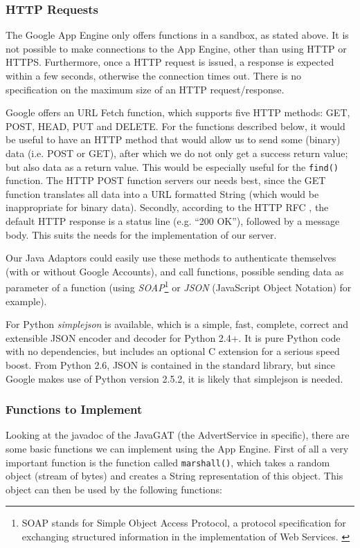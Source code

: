 \subsubsection{HTTP Requests}
The Google App Engine only offers functions in a sandbox, as stated above. It is
not possible to make connections to the App Engine, other than using HTTP or
HTTPS. Furthermore, once a HTTP request is issued, a response is expected within
a few seconds, otherwise the connection times out. There is no specification on
the maximum size of an HTTP request/response.

Google offers an URL Fetch function, which supports five HTTP methods: GET, POST,
HEAD, PUT and DELETE. For the functions described below, it would be useful to
have an HTTP method that would allow us to send some (binary) data (i.e. POST or
GET), after which we do not only get a success return value; but also data as a
return value. This would be especially useful for the \texttt{find()} function.
The HTTP POST function servers our needs best, since the GET function translates
all data into a URL formatted String (which would be inappropriate for binary
data). Secondly, according to the HTTP RFC , the default HTTP response is a
status line (e.g. ``200 OK''), followed by a message body. This suits the needs
for the implementation of our server.

Our Java Adaptors could easily use these methods to authenticate themselves (with
or without Google Accounts), and call functions, possible sending data as
parameter of a function (using \emph{SOAP}\footnote{SOAP stands for Simple
Object Access Protocol, a protocol specification for exchanging structured
information in the implementation of Web Services. \cite{soap-www}} or
\emph{JSON} (JavaScript Object Notation) \cite{json-www} for example).

For Python \emph{simplejson} \cite{simplejson-www} is available, which is a
simple, fast, complete, correct and extensible JSON encoder and decoder for
Python 2.4+. It is pure Python code with no dependencies, but includes an
optional C extension for a serious speed boost. From Python 2.6, JSON is
contained in the standard library, but since Google makes use of Python version
2.5.2, it is likely that simplejson is needed.

\subsubsection{Functions to Implement} 
Looking at the javadoc of the JavaGAT \cite{javagat-javadoc}(the AdvertService in
specific), there are some basic functions we can implement using the App Engine.
First of all a very important function is the function called
\texttt{marshall()}, which takes a random object (stream of bytes) and creates a
String representation of this object. This object can then be used by the
following functions:

